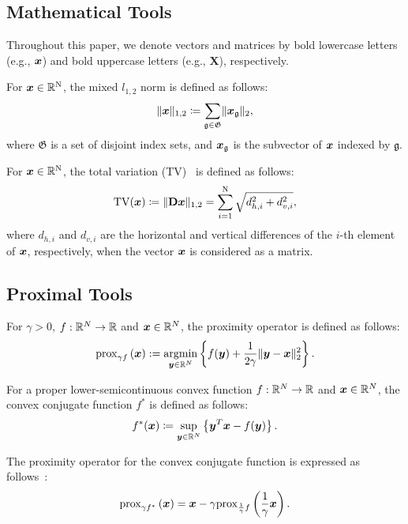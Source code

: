 \subsection{Mathematical Tools} \label{subsec:mathematical-tools}

Throughout this paper, we denote vectors and matrices by bold lowercase letters (e.g., $\bm{x}$) and bold uppercase letters (e.g., $\bm{X}$), respectively.

For $\bm{x} \in \mathbb{R}^{\mathrm{N}}$, the mixed $l_{1,2}$ norm is defined as follows:
\begin{equation} \label{eq:L12NormDefinitionEq} \lVert \bm{x} \rVert _{1,2} \coloneq \sum_{\mathfrak{g} \in \mathfrak{G}} \lVert \bm{x}_\mathfrak{g} \rVert _2, \end{equation}
where $\mathfrak{G}$ is a set of disjoint index sets, and $\bm{x}_{\mathfrak{g}}$ is the subvector of $\bm{x}$ indexed by $\mathfrak{g}$.

For $\bm{x} \in \mathbb{R}^{\mathrm{N}}$, the total variation (TV)~\cite{TV} is defined as follows:
\begin{equation} \label{eq:TVDefinitionEq} \mathrm{TV}(\bm{x}) \coloneq \lVert \mathbf{D} \bm{x} \rVert _{1,2} = \sum_{i=1}^{\mathrm{N}} \sqrt{d_{h,i}^2 + d_{v,i}^2}, \end{equation}
where $d_{h,i}$ and $d_{v,i}$ are the horizontal and vertical differences of the $i$-th element of $\bm{x}$, respectively, when the vector $\bm{x}$ is considered as a matrix.



\subsection{Proximal Tools} \label{subsec:proximal-tools}

For $\gamma > 0$, $f : \mathbb{R}^N \to \mathbb{R}$ and $\bm{x} \in \mathbb{R}^N$, the proximity operator is defined as follows:
\begin{equation} \label{eq:ProximityOperatorDefinitionEq} \mathrm{prox}_{ \gamma f }\left(\bm{x}\right) := \underset{\bm{y} \in \mathbb{R}^N}{\mathrm{argmin}} \left\{ f(\bm{y}) + \frac{1}{2 \gamma} \lVert \bm{y} - \bm{x} \rVert _2^2 \right\}. \end{equation}

For a proper lower-semicontinuous convex function $f : \mathbb{R}^N \to \mathbb{R}$ and $\bm{x} \in \mathbb{R}^N$, the convex conjugate function $f^*$ is defined as follows:
\begin{equation} \label{eq:ConjugateFunctionDefinitionEq} f^*(\bm{x}) \coloneq \sup_{\bm{y} \in \mathbb{R}^N} \left\{ \bm{y}^T \bm{x} - f(\bm{y}) \right\}. \end{equation}

The proximity operator for the convex conjugate function is expressed as follows~\cite[Theorem 3.1 (ii)]{prox-convex-conjugate-function}:
\begin{equation} \label{eq:ProximityOperatorDefinitionWithConvexConjugateFunctionEq} \mathrm{prox}_{ \gamma f^* }\left(\bm{x}\right) = \bm{x} - \gamma \mathrm{prox}_{ \frac 1 \gamma f }\left(\frac 1 \gamma \bm{x}\right). \end{equation}


